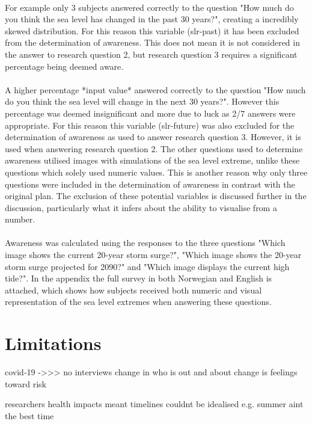 \paragraph{}
  For example only 3 subjects answered correctly to the question "How much do you think the sea level has changed in the past 30 years?", creating a incredibly skewed distribution. For this reason this variable (slr-past) it has been excluded from the determination of awareness. This does not mean it is not considered in the answer to research question 2, but research question 3 requires a significant percentage being deemed aware. 
\paragraph{}
  A higher percentage *input value* answered correctly to the question "How much do you think the sea level will change in the next 30 years?". However this percentage was deemed insignificant and more due to luck as 2/7 answers were appropriate. For this reason this variable (slr-future) was also excluded for the determination of awareness as used to answer research question 3. However, it is used when answering research question 2. The other questions used to determine awareness utilised images with simulations of the sea level extreme, unlike these questions which solely used numeric values. This is another reason why only three questions were included in the determination of awareness in contrast with the original plan. The exclusion of these potential variables is discussed further in the discussion, particularly what it infers about the ability to visualise from a number. 
\paragraph{}
Awareness was calculated using the responses to the three questions "Which image shows the current 20-year storm surge?", "Which image shows the 20-year storm surge projected for 2090?" and "Which image displays the current high tide?". In the appendix the full survey in both Norwegian and English is attached, which shows how subjects received both numeric and visual representation of the sea level extremes when answering these questions. 



\section{Limitations}
covid-19 ->>> no interviews
change in who is out and about
change is feelings toward risk

researchers health impacts meant timelines couldnt be idealised
e.g. summer aint the best time



